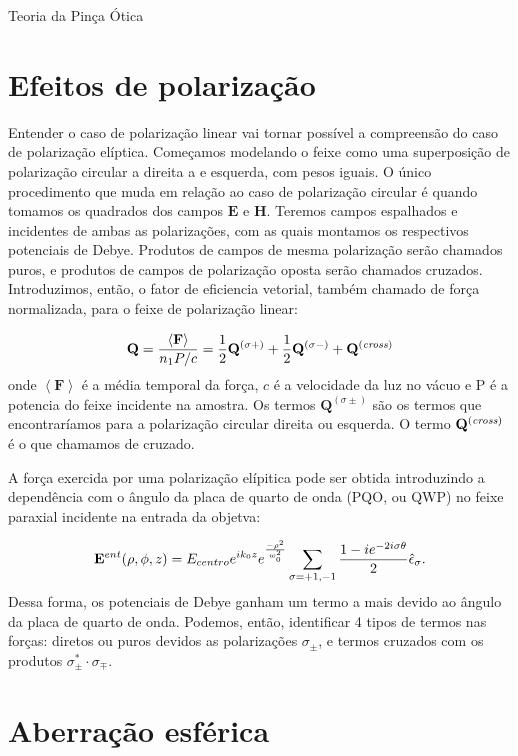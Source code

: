 \begin{chapter}{Teoria da Pinça Ótica}
\section{Efeitos de polarização}

\hspace{5 mm}Entender o caso de polarização linear vai tornar possível a compreensão do caso de polarização elíptica. Começamos modelando o feixe como uma superposição de polarização circular a direita a e esquerda, com pesos iguais. O único procedimento que muda em relação ao caso de polarização circular é quando tomamos os quadrados dos campos ${\mathbf E}$ e ${\mathbf H}$. Teremos campos espalhados e incidentes de ambas as polarizações, com as quais montamos os respectivos potenciais de Debye. Produtos de campos de mesma polarização serão chamados puros, e produtos de campos de polarização oposta serão chamados cruzados. Introduzimos, então, o fator de eficiencia vetorial, também chamado de força normalizada, para o feixe de polarização linear:

\begin{equation}
{\mathbf Q} = \frac{\left<{\mathbf F}\right>}{n_1 P/c}= \frac{1}{2}{\mathbf Q}^{(\sigma +)} + \frac{1}{2}{\mathbf Q}^{(\sigma -)} + {\mathbf Q}^{({\it cross})}
\end{equation}
%
onde $\left<{\mathbf F}\right>$ é a média temporal da força, $c$ é a velocidade da luz no vácuo e P é a potencia do feixe incidente na amostra. Os termos ${\mathbf Q}^{(\sigma \pm)}$ são os termos que encontraríamos para a polarização circular direita ou esquerda. O termo ${\mathbf Q}^{({\it cross})}$ é o que chamamos de cruzado. 

A força exercida por uma polarização elípitica pode ser obtida introduzindo a dependência com o ângulo da placa de quarto de onda (PQO, ou QWP) no feixe paraxial incidente na entrada da objetva:

\begin{equation}
{\mathbf E}^{ent}(\rho,\phi,z) = E_{centro} e^{ik_0z} e^{\frac{-\rho^2}{w_0^2}} \sum \limits_{\sigma = +1,-1} \frac{1 - ie^{-2i\sigma \theta}}{2} \hat{\bf{\epsilon}}_\sigma .
\label{l}
\end{equation}
%
Dessa forma, os potenciais de Debye ganham um termo a mais devido ao ângulo da placa de quarto de onda. Podemos, então, identificar 4 tipos de termos nas forças: diretos ou puros devidos as polarizações $\sigma_\pm$, e termos cruzados com os produtos $\sigma_\pm^*\cdot\sigma_\mp$.

\section{Aberração esférica}


\end{chapter}
